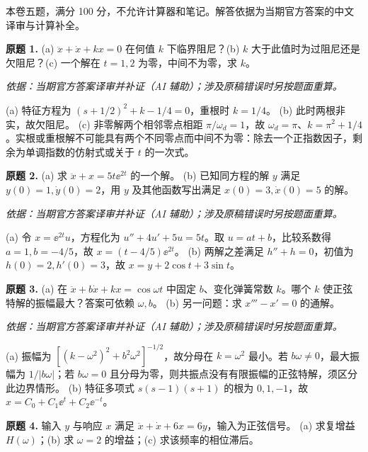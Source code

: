 本卷五题，满分 100 分，不允许计算器和笔记。解答依据为当期官方答案的中文译审与计算补全。
\begin{exercise}\label{cw:ex2-1}\textbf{原题 1.}
(a) $\ddot x+\dot x+kx=0$ 在何值 $k$ 下临界阻尼？(b) $k$ 大于此值时为过阻尼还是欠阻尼？(c) 一个解在 $t=1,2$ 为零，中间不为零，求 $k$。
\end{exercise}
\begin{solution}
\textit{依据：当期官方答案译审并补证（AI 辅助）；涉及原稿错误时另按题面重算。}\par
(a) 特征方程为 $(s+1/2)^2+k-1/4=0$，重根时 $k=1/4$。
(b) 此时两根非实，故欠阻尼。
(c) 非零解两个相邻零点相距 $\pi/\omega_d=1$，故 $\omega_d=\pi$、$k=\pi^2+1/4$。实根或重根解不可能具有两个不同零点而中间不为零：除去一个正指数因子，剩余为单调指数的仿射式或关于 $t$ 的一次式。
\end{solution}
\begin{exercise}\label{cw:ex2-2}\textbf{原题 2.}
(a) 求 $\ddot x+x=5t\ee^{2t}$ 的一个解。
(b) 已知同方程的解 $y$ 满足 $y(0)=1,\dot y(0)=2$，用 $y$ 及其他函数写出满足 $x(0)=3,\dot x(0)=5$ 的解。
\end{exercise}
\begin{solution}
\textit{依据：当期官方答案译审并补证（AI 辅助）；涉及原稿错误时另按题面重算。}\par
(a) 令 $x=\ee^{2t}u$，方程化为 $u''+4u'+5u=5t$。取 $u=at+b$，比较系数得 $a=1,b=-4/5$，故 $x=(t-4/5)\ee^{2t}$。
(b) 两解之差满足 $h''+h=0$，初值为 $h(0)=2,h'(0)=3$，故 $x=y+2\cos t+3\sin t$。
\end{solution}
\begin{exercise}\label{cw:ex2-3}\textbf{原题 3.}
(a) 在 $\ddot x+b\dot x+kx=\cos\omega t$ 中固定 $b$、变化弹簧常数 $k$。哪个 $k$ 使正弦特解的振幅最大？答案可依赖 $\omega,b$。
(b) 另一问题：求 $x'''-x'=0$ 的通解。
\end{exercise}
\begin{solution}
\textit{依据：当期官方答案译审并补证（AI 辅助）；涉及原稿错误时另按题面重算。}\par
(a) 振幅为 $[(k-\omega^2)^2+b^2\omega^2]^{-1/2}$，故分母在 $k=\omega^2$ 最小。若 $b\omega\ne0$，最大振幅为 $1/|b\omega|$；若 $b\omega=0$ 且分母为零，则共振点没有有限振幅的正弦特解，须区分此边界情形。
(b) 特征多项式 $s(s-1)(s+1)$ 的根为 $0,1,-1$，故 $x=C_0+C_1\ee^t+C_2\ee^{-t}$。
\end{solution}
\begin{exercise}\label{cw:ex2-4}\textbf{原题 4.} 输入 $y$ 与响应 $x$ 满足 $\ddot x+\dot x+6x=6y$，输入为正弦信号。
(a) 求复增益 $H(\omega)$；(b) 求 $\omega=2$ 的增益；(c) 求该频率的相位滞后。
\end{exercise}
